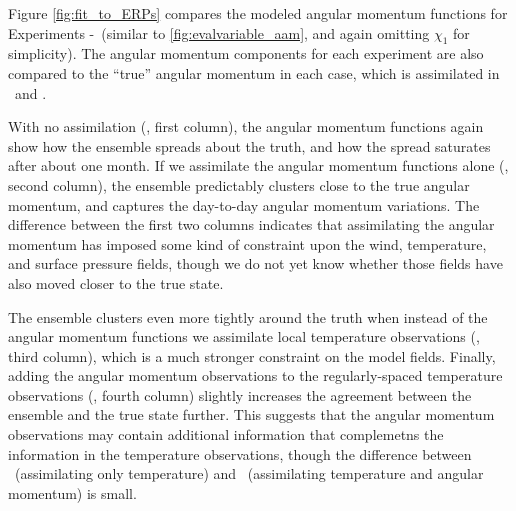 Figure \ref{fig:fit_to_ERPs} compares the modeled angular momentum functions for Experiments \NODA-\ERPRST~(similar to \ref{fig:evalvariable_aam}, and again omitting $\chi_1$ for simplicity). 
The angular momentum components for each experiment are also compared to the ``true'' angular momentum in each case, which is assimilated in \ERPALL ~and \ERPRST.  

With no assimilation (\NODA, first column), the angular momentum functions again show how the ensemble spreads about the truth, and how the spread saturates after about one month.
If we assimilate the angular momentum functions alone (\ERPALL, second column), the ensemble predictably clusters close to the true angular momentum, and captures the day-to-day angular momentum variations. 
The difference between the first two columns indicates that assimilating the angular momentum has imposed some kind of constraint upon the wind, temperature, and surface pressure fields, though we do not yet know whether those fields have also moved closer to the true state. 

The ensemble clusters even more tightly around the truth when instead of the angular momentum functions we assimilate local temperature observations (\RST, third column), which is a much stronger constraint on the model fields. 
Finally, adding the angular momentum observations to the regularly-spaced temperature observations (\ERPRST, fourth column) slightly increases the agreement between the ensemble and the true state further.  
This suggests that the angular momentum observations may contain additional information that complemetns the information in the temperature observations, though the difference between \RST ~(assimilating only temperature) and \ERPRST ~(assimilating temperature and angular momentum) is small.  
